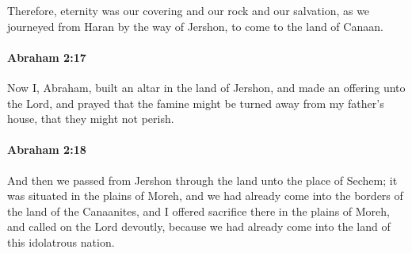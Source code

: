			Therefore, eternity was our covering and our rock and our salvation, as we journeyed from Haran by the way of Jershon, to come to the land of Canaan.


		\paragraph{Abraham 2:17} %
			\label{ABRAHAM-2-17}

			Now I, Abraham, built an altar in the land of Jershon, and made an offering unto the Lord, and prayed that the famine might be turned away from my father's house, that they might not perish.


		\paragraph{Abraham 2:18} %
			\label{ABRAHAM-2-18}

			And then we passed from Jershon through the land unto the place of Sechem; it was situated in the plains of Moreh, and we had already come into the borders of the land of the Canaanites, and I offered sacrifice there in the plains of Moreh, and called on the Lord devoutly, because we had already come into the land of this idolatrous nation.

